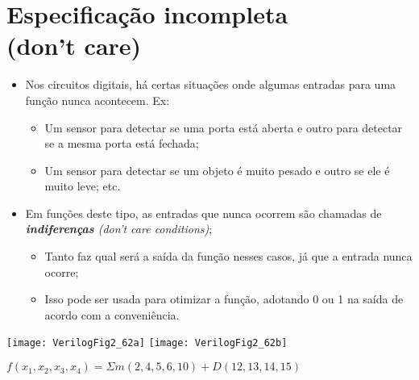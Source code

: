 \section{Especificação incompleta \\(don't care)}

\begin{frame}{\insertsection}
    \begin{itemize}
        \item Nos circuitos digitais, há certas situações onde algumas entradas para uma função nunca acontecem. Ex:
        \begin{itemize}
            \item Um sensor para detectar se uma porta está aberta e outro para detectar se a mesma porta está fechada;
            \item Um sensor para detectar se um objeto é muito pesado e outro se ele é muito leve; etc. 
        \end{itemize}
        \item Em funções deste tipo, as entradas que nunca ocorrem são chamadas de \textit{\textbf{indiferenças} (don't care conditions)};
        \begin{itemize}
            \item Tanto faz qual será a saída da função nesses casos, já que a entrada nunca ocorre;
            \item Isso pode ser usada para otimizar a função, adotando 0 ou 1 na saída de acordo com a conveniência.
        \end{itemize}
    \end{itemize}
\end{frame}

\begin{frame}{\insertsection}
    \centering
    \texttt{[image: VerilogFig2\_62a]}    
    \texttt{[image: VerilogFig2\_62b]}

    $f(x_1,x_2,x_3,x_4)=\Sigma m(2, 4, 5, 6, 10) + D(12, 13, 14, 15)$
\end{frame}

